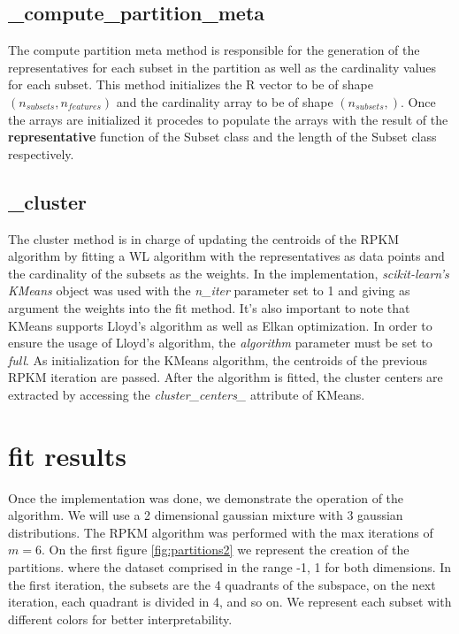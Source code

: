 \subsection{\_compute\_partition\_meta}

The compute partition meta method is responsible for the generation of the representatives for each subset in the partition as well as the cardinality values for each subset.
This method initializes the R vector to be of shape $(n_{subsets}, n_{features})$ and the cardinality array to be of shape $(n_{subsets}, )$. Once the arrays are initialized it procedes to populate the arrays with the result of the \textbf{representative} function of the Subset class and the length of the Subset class respectively.

\subsection{\_cluster}

The cluster method is in charge of updating the centroids of the RPKM algorithm by fitting a WL algorithm with the representatives as data points and the cardinality of the subsets as the weights. In the implementation, \textit{scikit-learn's KMeans} object was used with the \textit{n\_iter} parameter set to 1 and giving as argument the weights into the fit method. It's also important to note that KMeans supports Lloyd's algorithm as well as Elkan optimization. In order to ensure the usage of Lloyd's algorithm, the \textit{algorithm} parameter must be set to \textit{full}. As initialization for the KMeans algorithm, the centroids of the previous RPKM iteration are passed. After the algorithm is fitted, the cluster centers are extracted by accessing the \textit{cluster\_centers\_} attribute of KMeans.

\section{fit results}

Once the implementation was done, we demonstrate the operation of the algorithm. We will use a 2 dimensional gaussian mixture with 3 gaussian distributions. The RPKM algorithm was performed with the max iterations of $m=6$. On the first figure \ref{fig:partitions2} we represent the creation of the partitions. where the dataset comprised in the range -1, 1 for both dimensions. In the first iteration, the subsets are the 4 quadrants of the subspace, on the next iteration, each quadrant is divided in 4, and so on. We represent each subset with different colors for better interpretability.

